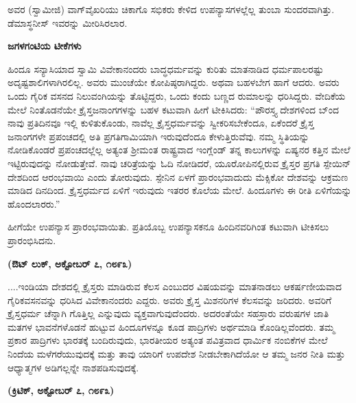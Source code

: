 ಅವರ (ಸ್ವಾಮೀಜಿ) ವಾಗ್​ವೈಖರಿಯು ಚಿಕಾಗೊ ಸಭಿಕರು ಕೇಳಿದ ಉಪನ್ಯಾಸಗಳಲ್ಲೆಲ್ಲ ತುಂಬಾ ಸುಂದರವಾಗಿತ್ತು. ಡೆಮಾಸ್ಥನೀಸ್​ ಇವರನ್ನು ಮೀರಿಸಿರಲಾರ.

\begin{center}
\textbf{ಜಗಳಗಂಟಿಯ ಟೀಕೆಗಳು}
\end{center}

ಹಿಂದೂ ಸನ್ಯಾಸಿಯಾದ ಸ್ವಾಮಿ ವಿವೇಕಾನಂದರು ಬಾದ್ಧಧರ್ಮವನ್ನು ಕುರಿತು ಮಾತನಾಡಿದ ಧರ್ಮಪಾಲರಷ್ಟು ಅದೃಷ್ಟಶಾಲಿಗಳಾಗಿರಲಿಲ್ಲ. ಅವರು ಮುಂಚೆಯೇ ಕೋಪಿಷ್ಠರಾಗಿದ್ದರು. ಅಥವಾ ಬಹಳಬೇಗ ಹಾಗೆ ಆದರು. ಅವರು ಒಂದು ಗೈರಿಕ ವಸನದ ನಿಲುವಂಗಿಯನ್ನು ತೊಟ್ಟಿದ್ದರು, ಒಂದು ಕಂದು ಬಣ್ಣದ ರುಮಾಲನ್ನು ಧರಿಸಿದ್ದರು. ವೇದಿಕೆಯ ಮೇಲೆ ನಿಂತೊಡನೆಯೇ ಕ್ರೈಸ್ತಜನಾಂಗಗಳನ್ನು ಬಹಳ ಕಟುವಾಗಿ ಹೀಗೆ ಟೀಕಿಸಿದರು: “ಪೌರಸ್ತ್ಯ ದೇಶಗಳಿಂದ ಬ್ಂದ ನಾವು ಪ್ರತಿದಿನವೂ ಇಲ್ಲಿ ಕುಳಿತುಕೊಂಡು, ನಾವೆಲ್ಲ ಕ್ರೈಸ್ತಧರ್ಮವನ್ನು ಸ್ವೀಕರಿಸಬೇಕೆಂದೂ, ಏಕೆಂದರೆ ಕ್ರೈಸ್ತ ಜನಾಂಗಗಳೇ ಪ್ರಪಂಚದಲ್ಲಿ ಅತಿ ಪ್ರಗತಿಗಾಮಿಯಾಗಿ ಇರುವುದೆಂದೂ ಕೇಳುತ್ತಿರುವೆವು. ನಮ್ಮ ಸ್ಥಿತಿಯನ್ನು ನೋಡಿಕೊಂಡರೆ ಪ್ರಪಂಚದಲ್ಲೆಲ್ಲ ಅತ್ಯಂತ ಶ‍್ರೀಮಂತ ರಾಷ್ಟ್ರವಾದ ಇಂಗ್ಲೆಂಡ್​ ತನ್ನ ಕಾಲುಗಳನ್ನು  ಏಷ್ಯನರ ಕತ್ತಿನ ಮೇಲೆ ಇಟ್ಟಿರುವುದನ್ನು ನೋಡುತ್ತೇವೆ. ನಾವು ಚರಿತ್ರೆಯನ್ನು ಓದಿ ನೋಡಿದರೆ, ಯೂರೋಪಿನಲ್ಲಿರುವ ಕ್ರೈಸ್ತರ ಪ್ರಗತಿ ಸ್ಪೇಯಿನ್​ ದೇಶದಿಂದ ಆರಂಭವಾಯಿ ಎಂದು ತೋರುವುದು. ಸ್ಪೇನಿನ ಏಳಗೆ ಪ್ರಾರಂಭವಾದುದು ಮೆಕ್ಸಿಕೋ ದೇಶವನ್ನು ಆಕ್ರಮಣ ಮಾಡಿದ ದಿನದಿಂದ. ಕ್ರೈಸ್ತಧರ್ಮದ ಏಳಿಗೆ ಇರುವುದು ಇತರರ ಕೊಲೆಯ ಮೇಲೆ. ಹಿಂದೂಗಳು ಈ ರೀತಿ ಏಳಿಗೆಯನ್ನು ಹೊಂದಲಾರರು.”

ಹೀಗೆಯೇ ಉಪನ್ಯಾಸ ಪ್ರಾರಂಭವಾಯಿತು. ಪ್ರತಿಯೊಬ್ಬ ಉಪನ್ಯಾಸಕನೂ ಹಿಂದಿನ\break ವರಿಗಿಂತ ಕಟುವಾಗಿ ಟೀಕಿಸಲು ಪ್ರಾರಂಭಿಸಿದನು.

\delimiter

\begin{center}
\textbf{(ಔಟ್​ ಲುಕ್​, ಅಕ್ಟೋಬರ್​ ೭, ೧೮೯೩)}
\end{center}

....ಇಂಡಿಯಾ ದೇಶದಲ್ಲಿ ಕ್ರೈಸ್ತರು ಮಾಡಿರುವ ಕೆಲಸ ಎಂಬುದರ ವಿಷಯವನ್ನು ಮಾತನಾಡಲು ಆಕರ್ಷಣೀಯವಾದ ಗೈರಿಕವಸನವನ್ನು ಧರಿಸಿದ ವಿವೇಕಾನಂದರು ಎದ್ದರು. ಅವರು ಕ್ರೈಸ್ತ ಮಿಶನರಿಗಳ ಕೆಲಸವನ್ನು ಜರಿದರು. ಅವರಿಗೆ ಕ್ರೈಸ್ತಧರ್ಮ ಚೆನ್ನಾಗಿ ಗೊತ್ತಿಲ್ಲ ಎನ್ನುವುದು ವ್ಯಕ್ತವಾಗುವುದೆಂದರು. ಅದರಂತೆಯೇ ಸಹಸ್ರಾರು ವರುಷಗಳ ಜಾತಿ ಮತಗಳ ಭಾವನೆಗಳೊಡನೆ ಹುಟ್ಟುವ ಹಿಂದೂಗಳನ್ನೂ ಕೂಡ ಪಾದ್ರಿಗಳು ಅರ್ಥಮಾಡಿ ಕೊಂಡಿಲ್ಲವೆಂದರು. ತಮ್ಮ ಪ್ರಕಾರ ಪಾದ್ರಿಗಳು ಭಾರತಕ್ಕೆ ಬಂದಿರುವುದು, ಭಾರತೀಯರ ಅತ್ಯಂತ ಪವಿತ್ರವಾದ ಧಾರ್ಮಿಕ ನಂಬಿಕೆಗಳ ಮೇಲೆ ನಿಂದೆಯ ಮಳೆಗರೆಯುವುದಕ್ಕೆ ಮತ್ತು ತಾವು ಯಾರಿಗೆ ಉಪದೇಶ ನೀಡಬೇಕಾಗಿದೆಯೋ ಆ ತಮ್ಮ ಜನರ ನೀತಿ ಮತ್ತು ಆಧ್ಯಾತ್ಮಗಳ ಅಡಿಗಲ್ಲನ್ನೇ ನಾಶಪಡಿಸುವುದಕ್ಕೆ.

\delimiter

\begin{center}
\textbf{(ಕ್ರಿಟಿಕ್​, ಅಕ್ಟೋಬರ್​ ೭, ೧೮೯೩)}
\end{center}

